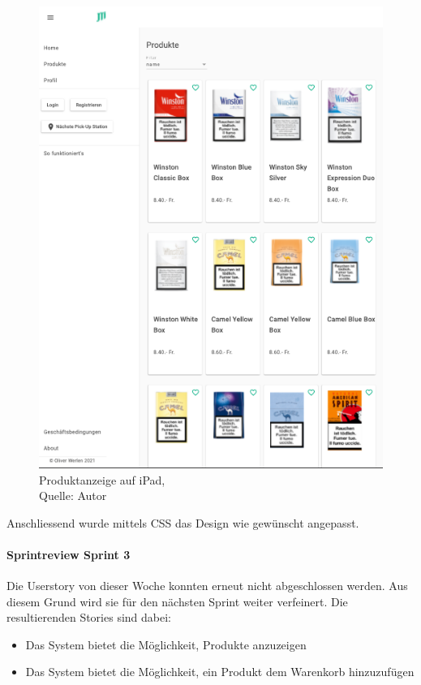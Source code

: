 \begin{figure}[h]
		\centering
		\includegraphics[scale=0.3]{images/productsTablet.PNG}
		\caption[Produktanzeige auf iPad]{Produktanzeige auf iPad,\\ Quelle: Autor}
		\label{img: Products iPad}
\end{figure} 

Anschliessend wurde mittels CSS das Design wie gewünscht angepasst. 

\paragraph{Sprintreview Sprint 3}
Die Userstory von dieser Woche konnten erneut nicht abgeschlossen werden. Aus diesem Grund wird sie für den nächsten Sprint weiter verfeinert. Die resultierenden Stories sind dabei: 
\begin{itemize}
	\item Das System bietet die Möglichkeit, Produkte anzuzeigen
	\item Das System bietet die Möglichkeit, ein Produkt dem Warenkorb hinzuzufügen
\end{itemize}


